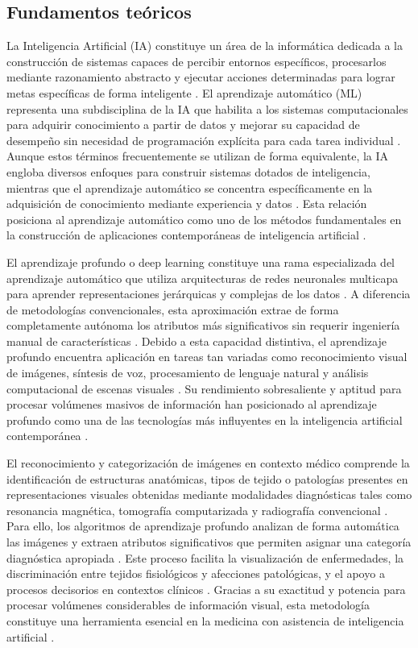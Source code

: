 \subsection{Fundamentos te\-ó\-ri\-cos}
\label{sec:theoretical_background}

La Inteligencia Artificial (IA) constituye un área de la informática dedicada a la construcción de sistemas capaces de percibir entornos específicos, procesarlos mediante razonamiento abstracto y ejecutar acciones determinadas para lograr metas específicas de forma inteligente \cite{ref33}. El aprendizaje automático (ML) representa una subdisciplina de la IA que habilita a los sistemas computacionales para adquirir conocimiento a partir de datos y mejorar su capacidad de desempeño sin necesidad de programación explícita para cada tarea individual \cite{ref33}. Aunque estos términos frecuentemente se utilizan de forma equivalente, la IA engloba diversos enfoques para construir sistemas dotados de inteligencia, mientras que el aprendizaje automático se concentra específicamente en la adquisición de conocimiento mediante experiencia y datos \cite{ref33}. Esta relación posiciona al aprendizaje automático como uno de los métodos fundamentales en la construcción de aplicaciones contemporáneas de inteligencia artificial \cite{ref33}.

El aprendizaje profundo o deep learning constituye una rama especializada del aprendizaje automático que utiliza arquitecturas de redes neuronales multicapa para aprender representaciones jerárquicas y complejas de los datos \cite{ref34}. A diferencia de metodologías convencionales, esta aproximación extrae de forma completamente autónoma los atributos más significativos sin requerir ingeniería manual de características \cite{ref34}. Debido a esta capacidad distintiva, el aprendizaje profundo encuentra aplicación en tareas tan variadas como reconocimiento visual de imágenes, síntesis de voz, procesamiento de lenguaje natural y análisis computacional de escenas visuales \cite{ref34}. Su rendimiento sobresaliente y aptitud para procesar volúmenes masivos de información han posicionado al aprendizaje profundo como una de las tecnologías más influyentes en la inteligencia artificial contemporánea \cite{ref34}.

El reconocimiento y categorización de imágenes en contexto médico comprende la identificación de estructuras anatómicas, tipos de tejido o patologías presentes en representaciones visuales obtenidas mediante modalidades diagnósticas tales como resonancia magnética, tomografía computarizada y radiografía convencional \cite{ref35}. Para ello, los algoritmos de aprendizaje profundo analizan de forma automática las imágenes y extraen atributos significativos que permiten asignar una categoría diagnóstica apropiada \cite{ref35}. Este proceso facilita la visualización de enfermedades, la discriminación entre tejidos fisiológicos y afecciones patológicas, y el apoyo a procesos decisorios en contextos clínicos \cite{ref35}. Gracias a su exactitud y potencia para procesar volúmenes considerables de información visual, esta metodología constituye una herramienta esencial en la medicina con asistencia de inteligencia artificial \cite{ref35}.

